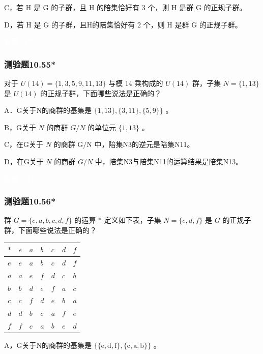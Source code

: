 \documentclass[UTF8, heading=true]{ctexart}
\begin{document}
C，若 H 是 G 的子群，且 H 的陪集恰好有 3 个，则 H 是群 G 的正规子群。

D，若 H 是 G 的子群，且H的陪集恰好有 2 个，则 H 是群 G 的正规子群。

\textcolor{white}{答案：BD}


\subsubsection{测验题10.55*}

对于 $U(14)=\{1,3,5,9,11,13\}$ 与模 14 乘构成的 $U(14)$ 群，子集 $N=\{1,13\}$ 是 $U(14)$ 的正规子群，下面哪些说法是正确的？

A．G关于N的商群的基集是 $\{1,13\},\{3,11\},\{5,9\}\}$ 。

B，G关于 $N$ 的商群 $G / N$ 的单位元 $\{1,13\}$ 。

C，在G关于 $N$ 的商群 $\mathrm{G} / \mathrm{N}$ 中，陪集N3的逆元是陪集N11。

D，在G关于 $N$ 的商群 $G / N$ 中，陪集N3与陪集N11的运算结果是陪集N13。

\textcolor{white}{答案：AB}

\subsubsection{测验题10.56*}

群 $G=\{e, a, b, c, d, f\}$ 的运算 $*$ 定义如下表，子集 $N=\{e, d, f\}$ 是 $G$ 的正规子群，下面哪些说法是正确的？

\begin{table}[H]
  \renewcommand{\arraystretch}{1.5}
  \centering
\begin{tabular}{l|llllll}
\hline$*$ & $e$ & $a$ & $b$ & $c$ & $d$ & $f$ \\
\hline$e$ & $e$ & $a$ & $b$ & $c$ & $d$ & $f$ \\
$a$ & $a$ & $e$ & $f$ & $d$ & $c$ & $b$ \\
$b$ & $b$ & $d$ & $e$ & $f$ & $a$ & $c$ \\
$c$ & $c$ & $f$ & $d$ & $e$ & $b$ & $a$ \\
$d$ & $d$ & $b$ & $c$ & $a$ & $f$ & $e$ \\
$f$ & $f$ & $c$ & $a$ & $b$ & $e$ & $d$ \\
\hline
\end{tabular}
\end{table}

A，G关于N的商群的基集是 $\{\{\mathrm{e}, \mathrm{d}, \mathrm{f}\},\{\mathrm{c}, \mathrm{a}, \mathrm{b}\}\}$ 。
\end{document}
